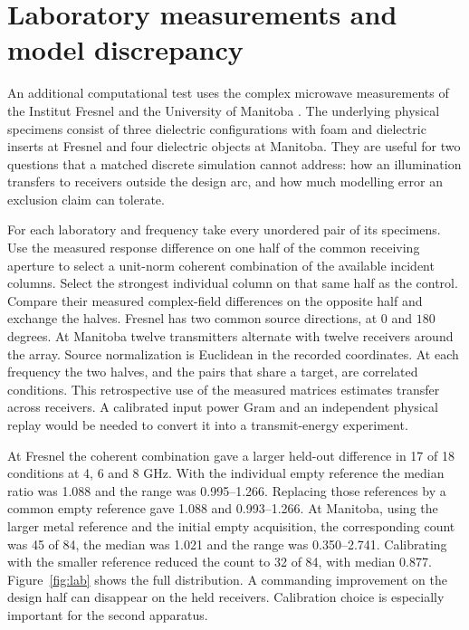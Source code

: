 \section{Laboratory measurements and model discrepancy}\label{sec:lab}
An additional computational test uses the complex microwave measurements of the Institut Fresnel and the University of Manitoba \cite{fresnel,manitoba}. The underlying physical specimens consist of three dielectric configurations with foam and dielectric inserts at Fresnel and four dielectric objects at Manitoba. They are useful for two questions that a matched discrete simulation cannot address: how an illumination transfers to receivers outside the design arc, and how much modelling error an exclusion claim can tolerate.

For each laboratory and frequency take every unordered pair of its specimens. Use the measured response difference on one half of the common receiving aperture to select a unit-norm coherent combination of the available incident columns. Select the strongest individual column on that same half as the control. Compare their measured complex-field differences on the opposite half and exchange the halves. Fresnel has two common source directions, at $0$ and $180$ degrees. At Manitoba twelve transmitters alternate with twelve receivers around the array. Source normalization is Euclidean in the recorded coordinates. At each frequency the two halves, and the pairs that share a target, are correlated conditions. This retrospective use of the measured matrices estimates transfer across receivers. A calibrated input power Gram and an independent physical replay would be needed to convert it into a transmit-energy experiment.

At Fresnel the coherent combination gave a larger held-out difference in 17 of 18 conditions at 4, 6 and 8 GHz. With the individual empty reference the median ratio was 1.088 and the range was 0.995--1.266. Replacing those references by a common empty reference gave 1.088 and 0.993--1.266. At Manitoba, using the larger metal reference and the initial empty acquisition, the corresponding count was 45 of 84, the median was 1.021 and the range was 0.350--2.741. Calibrating with the smaller reference reduced the count to 32 of 84, with median 0.877. Figure~\ref{fig:lab} shows the full distribution. A commanding improvement on the design half can disappear on the held receivers. Calibration choice is especially important for the second apparatus.

